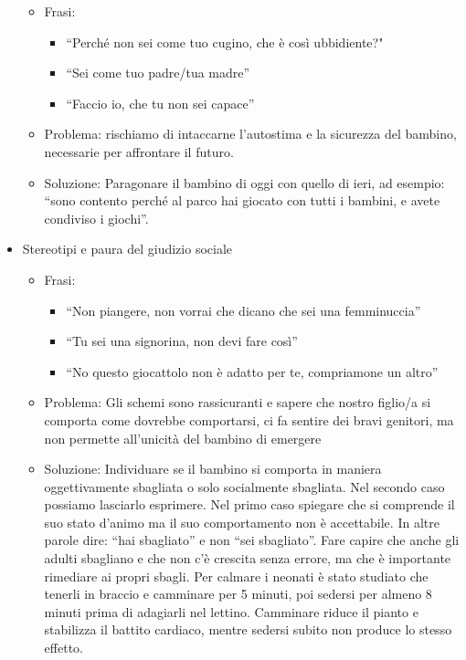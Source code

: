 \documentclass[12pt]{book} %
\begin{document}
\begin{itemize}
\begin{itemize}
\item Frasi:

\begin{itemize}
\item “Perché non sei come tuo cugino, che è così ubbidiente?"
\item “Sei come tuo padre/tua madre”
\item “Faccio io, che tu non sei capace”
\end{itemize}
\item Problema: rischiamo di intaccarne l'autostima e la sicurezza del bambino, necessarie per
affrontare il futuro. 
\item Soluzione: Paragonare il bambino di oggi con quello di ieri, ad esempio: “sono contento perché al parco hai
giocato con tutti i bambini, e avete condiviso i giochi”.
\end{itemize}
\item Stereotipi e paura del giudizio sociale

\begin{itemize}
\item Frasi:

\begin{itemize}
\item “Non piangere, non vorrai che dicano che sei una femminuccia”
\item “Tu sei una signorina, non devi fare così”
\item “No questo giocattolo non è adatto per te, compriamone un altro” 
\end{itemize}
\item Problema: Gli schemi sono rassicuranti e sapere che nostro figlio/a si comporta come dovrebbe comportarsi, ci fa
sentire dei bravi genitori, ma non permette all'unicità del bambino di emergere
\item Soluzione: Individuare se il bambino si comporta in maniera oggettivamente sbagliata o solo socialmente sbagliata.
Nel secondo caso possiamo lasciarlo esprimere. Nel primo caso spiegare che si comprende il suo stato
d'animo ma il suo comportamento non è accettabile. In altre parole dire: “hai sbagliato” e non
“sei sbagliato”. Fare capire che anche gli adulti sbagliano e che non c'è crescita senza errore, ma che è importante
rimediare ai propri sbagli. Per calmare i neonati è stato studiato che tenerli in braccio e camminare per 5 minuti, poi sedersi per almeno 8 minuti prima di adagiarli nel lettino. Camminare riduce il pianto e stabilizza il battito cardiaco, mentre sedersi subito non produce lo stesso effetto.
\end{itemize}
\end{itemize}
\end{document}
